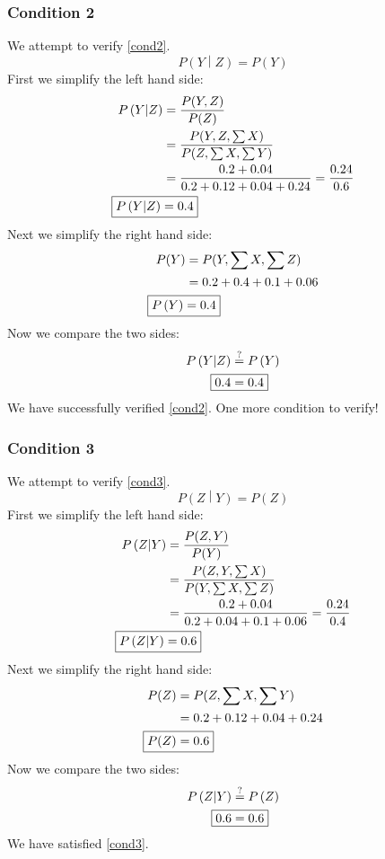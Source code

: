 \documentclass[12pt,letterpaper]{article}
\begin{document}
\subsubsection*{Condition 2}
We attempt to verify \eqref{cond2}.
\begin{equation*}
P\left(Y\middle|Z\right) = P\left(Y\right)
\end{equation*}
First we simplify the left hand side:
\begin{align*}
P\left(Y\middle|Z\right) &= \frac{P(Y,Z)}{P(Z)}\\
&= \frac{P(Y,Z,\sum{X})}{P(Z,\sum{X},\sum{Y})}\\
&= \frac{0.2+0.04}{0.2+0.12+0.04+0.24} = \frac{0.24}{0.6}\\
\Aboxed{P\left(Y\middle|Z\right) &= 0.4}
\end{align*}
Next we simplify the right hand side:
\begin{align*}
P(Y) &= P(Y,\sum{X},\sum{Z})\\
&= 0.2+0.4+0.1+0.06\\
\Aboxed{P\left(Y\right) &= 0.4}
\end{align*}
Now we compare the two sides:
\begin{align*}
P\left(Y\middle|Z\right) &\stackrel{?}{=} P\left(Y\right)\\
\Aboxed{0.4 &= 0.4}
\end{align*}
We have successfully verified \eqref{cond2}. One more condition to verify!
\subsubsection*{Condition 3}
We attempt to verify \eqref{cond3}.
\begin{equation*}
P\left(Z\middle|Y\right) = P\left(Z\right)
\end{equation*}
First we simplify the left hand side:
\begin{align*}
P\left(Z\middle|Y\right) &= \frac{P(Z,Y)}{P(Y)}\\
&= \frac{P(Z,Y,\sum{X})}{P(Y,\sum{X},\sum{Z})}\\
&= \frac{0.2+0.04}{0.2+0.04+0.1+0.06} = \frac{0.24}{0.4}\\
\Aboxed{P\left(Z\middle|Y\right) &= 0.6}
\end{align*}
Next we simplify the right hand side:
\begin{align*}
P(Z) &= P(Z,\sum{X},\sum{Y})\\
&= 0.2+0.12+0.04+0.24\\
\Aboxed{P(Z) &= 0.6}
\end{align*}
Now we compare the two sides:
\begin{align*}
P\left(Z\middle|Y\right) &\stackrel{?}{=} P\left(Z\right)\\
\Aboxed{0.6 &= 0.6}
\end{align*}
We have satisfied \eqref{cond3}.
\end{document}
